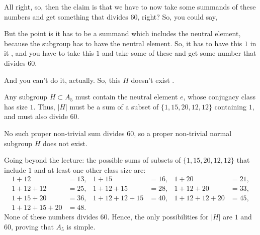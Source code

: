 \begin{proofWrapper}
\begin{hidden}
\end{hidden}

\begin{speech}[00:25:12 - 00:25:52]
All right, so, then the claim is that we have to now take some summands of these numbers and get something that divides $60$, right? So, you could say, 

But the point is it has to be a summand which includes the neutral element, because the subgroup has to have the neutral element. So, it has to have this $1$ in it , and you have to take this $1$ and take some of these  and get some number that divides $60$.

And you can't do it, actually. So, this $H$ doesn't exist .
\end{speech}

\begin{content}
Any subgroup $H \subset A_5$ must contain the neutral element $e$, whose conjugacy class has size $1$. Thus, $|H|$ must be a sum of a subset of $\{1, 15, 20, 12, 12\}$ containing $1$, and must also divide $60$.

No such proper non-trivial sum divides $60$, so a proper non-trivial normal subgroup $H$ does not exist.

\begin{steps}
Going beyond the lecture: the possible sums of subsets of $\{1, 15, 20, 12, 12\}$ that include $1$ and at least one other class size are:
\begin{align*}
1 + 12 &= 13, & 1 + 15 &= 16, & 1 + 20 &= 21, \\
1 + 12 + 12 &= 25, & 1 + 12 + 15 &= 28, & 1 + 12 + 20 &= 33, \\
1 + 15 + 20 &= 36, & 1 + 12 + 12 + 15 &= 40, & 1 + 12 + 12 + 20 &= 45, \\
1 + 12 + 15 + 20 &= 48.
\end{align*}
None of these numbers divides $60$. Hence, the only possibilities for $|H|$ are $1$ and $60$, proving that $A_5$ is simple.
\end{steps}
\end{content}

\end{proofWrapper}

